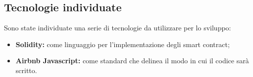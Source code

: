 \subsection{Tecnologie individuate}
Sono state individuate una serie di tecnologie da utilizzare per lo sviluppo:
\begin{itemize}
	\item \textbf{Solidity:} come linguaggio per l'implementazione degli smart contract;
	\item \textbf{Airbnb Javascript}\textbf{:} come standard che delinea il modo in cui il codice sarà scritto.
\end{itemize}
